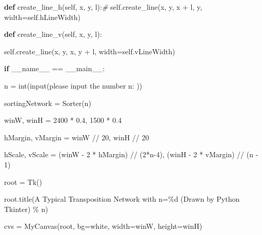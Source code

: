\documentclass[
]{article}
\newenvironment{Shaded}{}{}
\newcommand{\BuiltInTok}[1]{#1}
\newcommand{\CommentTok}[1]{\textcolor[rgb]{0.38,0.63,0.69}{\textit{#1}}}
\newcommand{\ControlFlowTok}[1]{\textcolor[rgb]{0.00,0.44,0.13}{\textbf{#1}}}
\newcommand{\DecValTok}[1]{\textcolor[rgb]{0.25,0.63,0.44}{#1}}
\newcommand{\FloatTok}[1]{\textcolor[rgb]{0.25,0.63,0.44}{#1}}
\newcommand{\KeywordTok}[1]{\textcolor[rgb]{0.00,0.44,0.13}{\textbf{#1}}}
\newcommand{\NormalTok}[1]{#1}
\newcommand{\OperatorTok}[1]{\textcolor[rgb]{0.40,0.40,0.40}{#1}}
\newcommand{\SpecialCharTok}[1]{\textcolor[rgb]{0.25,0.44,0.63}{#1}}
\newcommand{\StringTok}[1]{\textcolor[rgb]{0.25,0.44,0.63}{#1}}
\newcommand{\VariableTok}[1]{\textcolor[rgb]{0.10,0.09,0.49}{#1}}
\begin{document}
\begin{Shaded}
\begin{Highlighting}[]
    \KeywordTok{def}\NormalTok{ create\_line\_h(}\VariableTok{self}\NormalTok{, x, y, l):}\CommentTok{\#
}
        \VariableTok{self}\NormalTok{.create\_line(x, y, x }\OperatorTok{+}\NormalTok{ l, y, width}\OperatorTok{=}\VariableTok{self}\NormalTok{.hLineWidth)
}


    \KeywordTok{def}\NormalTok{ create\_line\_v(}\VariableTok{self}\NormalTok{, x, y, l):
}
        \VariableTok{self}\NormalTok{.create\_line(x, y, x, y }\OperatorTok{+}\NormalTok{ l, width}\OperatorTok{=}\VariableTok{self}\NormalTok{.vLineWidth)
}


\ControlFlowTok{if} \VariableTok{\_\_name\_\_} \OperatorTok{==} \StringTok{\textquotesingle{}\_\_main\_\_\textquotesingle{}}\NormalTok{:
}
\NormalTok{    n }\OperatorTok{=} \BuiltInTok{int}\NormalTok{(}\BuiltInTok{input}\NormalTok{(}\StringTok{\textquotesingle{}please input the number n: \textquotesingle{}}\NormalTok{))
}
\NormalTok{    sortingNetwork }\OperatorTok{=}\NormalTok{ Sorter(n)
}


\NormalTok{    winW, winH }\OperatorTok{=} \DecValTok{2400} \OperatorTok{*} \FloatTok{0.4}\NormalTok{, }\DecValTok{1500} \OperatorTok{*} \FloatTok{0.4}

\NormalTok{    hMargin, vMargin }\OperatorTok{=}\NormalTok{ winW }\OperatorTok{//} \DecValTok{20}\NormalTok{, winH }\OperatorTok{//} \DecValTok{20}

\NormalTok{    hScale, vScale }\OperatorTok{=}\NormalTok{ (winW }\OperatorTok{{-}} \DecValTok{2} \OperatorTok{*}\NormalTok{ hMargin) }\OperatorTok{//}\NormalTok{ (}\DecValTok{2}\OperatorTok{*}\NormalTok{n}\OperatorTok{{-}}\DecValTok{4}\NormalTok{), (winH }\OperatorTok{{-}} \DecValTok{2} \OperatorTok{*}\NormalTok{ vMargin) }\OperatorTok{//}\NormalTok{ (n }\OperatorTok{{-}} \DecValTok{1}\NormalTok{)
}


\NormalTok{    root }\OperatorTok{=}\NormalTok{ Tk()
}
\NormalTok{    root.title(}\StringTok{\textquotesingle{}A Typical Transposition Network with n=}\SpecialCharTok{\%d}\StringTok{ (Drawn by Python Tkinter)\textquotesingle{}} \OperatorTok{\%}\NormalTok{ n)
}
\NormalTok{    cvs }\OperatorTok{=}\NormalTok{ MyCanvas(root, bg}\OperatorTok{=}\StringTok{\textquotesingle{}white\textquotesingle{}}\NormalTok{, width}\OperatorTok{=}\NormalTok{winW, height}\OperatorTok{=}\NormalTok{winH)
}



\end{Highlighting}
\end{Shaded}
\end{document}
